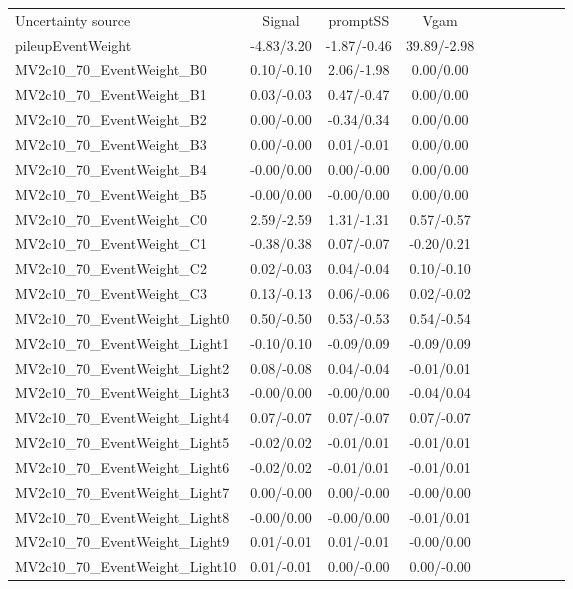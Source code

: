 \begin{table}[h]
\scriptsize
\begin{center}
\begin{tabular}{l|ccccccccc}
\hline
\hline
Uncertainty source &Signal &promptSS &Vgam \\
pileupEventWeight &-4.83/3.20 &-1.87/-0.46 &39.89/-2.98 \\
MV2c10\_70\_EventWeight\_B0 &0.10/-0.10 &2.06/-1.98 &0.00/0.00 \\
MV2c10\_70\_EventWeight\_B1 &0.03/-0.03 &0.47/-0.47 &0.00/0.00 \\
MV2c10\_70\_EventWeight\_B2 &0.00/-0.00 &-0.34/0.34 &0.00/0.00 \\
MV2c10\_70\_EventWeight\_B3 &0.00/-0.00 &0.01/-0.01 &0.00/0.00 \\
MV2c10\_70\_EventWeight\_B4 &-0.00/0.00 &0.00/-0.00 &0.00/0.00 \\
MV2c10\_70\_EventWeight\_B5 &-0.00/0.00 &-0.00/0.00 &0.00/0.00 \\
MV2c10\_70\_EventWeight\_C0 &2.59/-2.59 &1.31/-1.31 &0.57/-0.57 \\
MV2c10\_70\_EventWeight\_C1 &-0.38/0.38 &0.07/-0.07 &-0.20/0.21 \\
MV2c10\_70\_EventWeight\_C2 &0.02/-0.03 &0.04/-0.04 &0.10/-0.10 \\
MV2c10\_70\_EventWeight\_C3 &0.13/-0.13 &0.06/-0.06 &0.02/-0.02 \\
MV2c10\_70\_EventWeight\_Light0 &0.50/-0.50 &0.53/-0.53 &0.54/-0.54 \\
MV2c10\_70\_EventWeight\_Light1 &-0.10/0.10 &-0.09/0.09 &-0.09/0.09 \\
MV2c10\_70\_EventWeight\_Light2 &0.08/-0.08 &0.04/-0.04 &-0.01/0.01 \\
MV2c10\_70\_EventWeight\_Light3 &-0.00/0.00 &-0.00/0.00 &-0.04/0.04 \\
MV2c10\_70\_EventWeight\_Light4 &0.07/-0.07 &0.07/-0.07 &0.07/-0.07 \\
MV2c10\_70\_EventWeight\_Light5 &-0.02/0.02 &-0.01/0.01 &-0.01/0.01 \\
MV2c10\_70\_EventWeight\_Light6 &-0.02/0.02 &-0.01/0.01 &-0.01/0.01 \\
MV2c10\_70\_EventWeight\_Light7 &0.00/-0.00 &0.00/-0.00 &-0.00/0.00 \\
MV2c10\_70\_EventWeight\_Light8 &-0.00/0.00 &-0.00/0.00 &-0.01/0.01 \\
MV2c10\_70\_EventWeight\_Light9 &0.01/-0.01 &0.01/-0.01 &-0.00/0.00 \\
MV2c10\_70\_EventWeight\_Light10 &0.01/-0.01 &0.00/-0.00 &0.00/-0.00 \\

\end{tabular}
\end{center}
\end{table}
